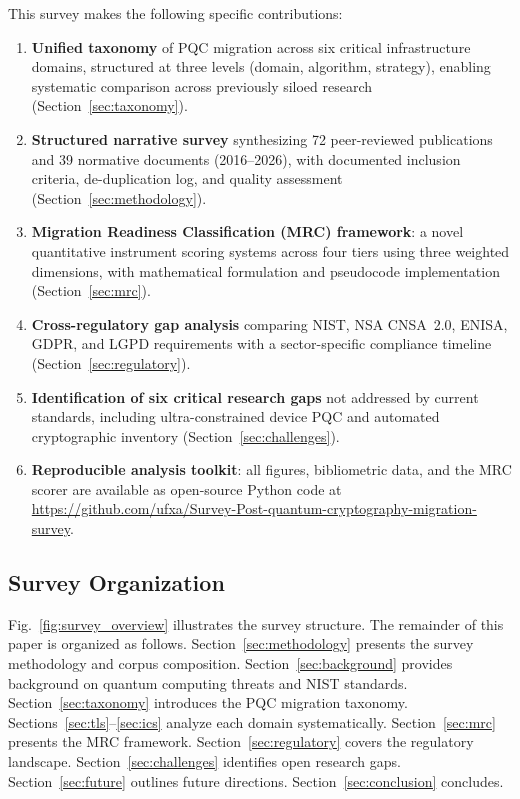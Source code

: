 \documentclass[journal]{IEEEtran}
\begin{document}
This survey makes the following specific contributions:
\begin{enumerate}
  \item \textbf{Unified taxonomy} of PQC migration across six critical
  infrastructure domains, structured at three levels (domain, algorithm,
  strategy), enabling systematic comparison across previously siloed research
  (Section~\ref{sec:taxonomy}).
  \item \textbf{Structured narrative survey} synthesizing 72 peer-reviewed
  publications and 39 normative documents (2016--2026), with documented
  inclusion criteria, de-duplication log, and quality assessment
  (Section~\ref{sec:methodology}).
  \item \textbf{Migration Readiness Classification (MRC) framework}: a novel
  quantitative instrument scoring systems across four tiers using three weighted
  dimensions, with mathematical formulation and pseudocode implementation
  (Section~\ref{sec:mrc}).
  \item \textbf{Cross-regulatory gap analysis} comparing NIST, NSA CNSA~2.0,
  ENISA, GDPR, and LGPD requirements with a sector-specific compliance
  timeline (Section~\ref{sec:regulatory}).
  \item \textbf{Identification of six critical research gaps} not addressed by
  current standards, including ultra-constrained device PQC and automated
  cryptographic inventory (Section~\ref{sec:challenges}).
  \item \textbf{Reproducible analysis toolkit}: all figures, bibliometric data,
  and the MRC scorer are available as open-source Python code at
  \url{https://github.com/ufxa/Survey-Post-quantum-cryptography-migration-survey}.
\end{enumerate}

\subsection{Survey Organization}

Fig.~\ref{fig:survey_overview} illustrates the survey structure. The remainder
of this paper is organized as follows. Section~\ref{sec:methodology} presents
the survey methodology and corpus composition. Section~\ref{sec:background} provides background
on quantum computing threats and NIST standards. Section~\ref{sec:taxonomy}
introduces the PQC migration taxonomy. Sections~\ref{sec:tls}--\ref{sec:ics}
analyze each domain systematically. Section~\ref{sec:mrc} presents the MRC
framework. Section~\ref{sec:regulatory} covers the regulatory landscape.
Section~\ref{sec:challenges} identifies open research gaps. Section~\ref{sec:future}
outlines future directions. Section~\ref{sec:conclusion} concludes.
\end{document}
